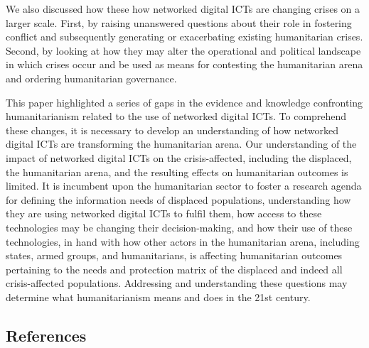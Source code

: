 \documentclass[
]{article}
\begin{document}
We also discussed how these how networked digital ICTs are changing
crises on a larger scale. First, by raising unanswered questions about
their role in fostering conflict and subsequently generating or
exacerbating existing humanitarian crises. Second, by looking at how
they may alter the operational and political landscape in which crises
occur and be used as means for contesting the humanitarian arena and
ordering humanitarian governance.

This paper highlighted a series of gaps in the evidence and knowledge
confronting humanitarianism related to the use of networked digital
ICTs. To comprehend these changes, it is necessary to develop an
understanding of how networked digital ICTs are transforming the
humanitarian arena. Our understanding of the impact of networked digital
ICTs on the crisis-affected, including the displaced, the humanitarian
arena, and the resulting effects on humanitarian outcomes is limited. It
is incumbent upon the humanitarian sector to foster a research agenda
for defining the information needs of displaced populations,
understanding how they are using networked digital ICTs to fulfil them,
how access to these technologies may be changing their decision-making,
and how their use of these technologies, in hand with how other actors
in the humanitarian arena, including states, armed groups, and
humanitarians, is affecting humanitarian outcomes pertaining to the
needs and protection matrix of the displaced and indeed all
crisis-affected populations. Addressing and understanding these
questions may determine what humanitarianism means and does in the 21st
century.

\hypertarget{references}{%
\subsection*{References}\label{references}}
\end{document}
